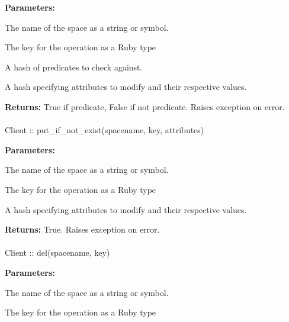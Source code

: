 \noindent\textbf{Parameters:}
\begin{description}[labelindent=\widthof{{\code{predicates}}},leftmargin=*,noitemsep,nolistsep,align=right]
\item[\code{spacename}] The name of the space as a string or symbol.
\item[\code{key}] The key for the operation as a Ruby type
\item[\code{predicates}] A hash of predicates to check against.
\item[\code{attributes}] A hash specifying attributes to modify and their respective values.
\end{description}

\noindent\textbf{Returns:}
True if predicate, False if not predicate.  Raises exception on error.

\paragraph{}
\begin{ccode}
Client :: put_if_not_exist(spacename, key, attributes)
\end{ccode}
\funcdesc 

\noindent\textbf{Parameters:}
\begin{description}[labelindent=\widthof{{\code{attributes}}},leftmargin=*,noitemsep,nolistsep,align=right]
\item[\code{spacename}] The name of the space as a string or symbol.
\item[\code{key}] The key for the operation as a Ruby type
\item[\code{attributes}] A hash specifying attributes to modify and their respective values.
\end{description}

\noindent\textbf{Returns:}
True.  Raises exception on error.

\paragraph{}
\begin{ccode}
Client :: del(spacename, key)
\end{ccode}
\funcdesc 

\noindent\textbf{Parameters:}
\begin{description}[labelindent=\widthof{{\code{spacename}}},leftmargin=*,noitemsep,nolistsep,align=right]
\item[\code{spacename}] The name of the space as a string or symbol.
\item[\code{key}] The key for the operation as a Ruby type
\end{description}

